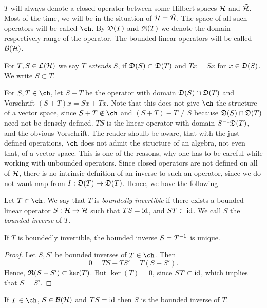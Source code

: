 \documentclass[a4paper,10pt]{article}
\begin{document}
$T$ will always denote a closed operator between some Hilbert spaces $\mathcal{H}$ and $ \tilde{\mathcal{H}}$. Most of the time, we will be in the situation of $\mathcal{H} = \tilde{\mathcal{H}}$. The space of all such operators will be called $\ch$. By $\mathfrak{D}(T)$ and $\mathfrak{R}(T)$ we denote the domain respectively range of the operator. The bounded linear operators will be called $\mathcal{B}(\mathcal{H})$.
\begin{defi}
  For $T, S \in \mathcal{L}(\mathcal{H})$ we say $T$ \textit{extends} $S$, if $\mathfrak{D}(S)\subset \mathfrak{D}(T)$ and $ Tx = Sx$ for $x \in \mathfrak{D} (S)$. We write $S \subset T$.
\end{defi}
For $S, T \in \ch$, let $S + T$ be the operator with domain $\mathfrak{D}(S) \cap \mathfrak{D}(T)$ and Vorschrift $(S + T)x = Sx + Tx$. Note that this does not give $\ch$ the structure of a vector space, since $S +T \notin \ch$ and  $(S + T) - T \neq S$ because $\mathfrak{D}(S) \cap \mathfrak{D}(T)$ need not be densely defined. $TS$ is the linear operator with domain $S^{-1} \mathfrak{D}(T)$, and the obvious Vorschrift. The reader shoulb be aware, that with the just defined operations, $\ch$ does not admit the structure of an algebra, not even that, of a vector space. This is one of the reasons, why one has to be careful while working with unbounded operators. Since closed operators are not defined on all of $\mathcal{H}$, there is no intrinsic defnition of an inverse to such an operator, since we do not want map from $I: \mathfrak{D}(T) \to \mathfrak{D}(T)$. Hence, we have the following
\begin{defi}
 \cancer Let $T \in \ch$. We say that $T$ is \textit{boundedly invertible} if there exists a bounded linear operator $S: \mathcal{H} \to \mathcal{H}$ such that $TS = \operatorname{id}$, and $ST \subset \operatorname{id}$. We call $S$ the \textit{bounded inverse} of $T$.
\end{defi}

\begin{lem}
 If $T$ is boundedly invertible, the bounded inverse $S= T^{-1}$ is unique. 
\end{lem}

\begin{proof}

 Let $S, S'$ be bounded inverses of $T \in \ch$. Then
 \[
  0 = TS - TS' = T(S - S').
 \]
Hence, $ \mathfrak{R}(S - S') \subset \ker(T)$. But $\ker(T) = 0$, since $ST \subset \operatorname{id}$, which implies that $S = S'$.
\end{proof}


\begin{lem}
 If $T \in \ch$, $S \in \mathcal{B}(\mathcal{H})$ and $ TS = \operatorname{id}$ then $S$ is the bounded inverse of $T$.
\end{lem}
\end{document}
